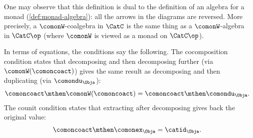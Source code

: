 \begin{remark}
\label{rem:coalgebra-duality}
One may observe that this definition is dual to the definition of an algebra for a monad (\cref{def:monad-algebra}): all the arrows in the diagrams are reversed.
More precisely, a $\comonW$-coalgebra in $\CatC$ is the same thing as a $\comonW$-algebra in $\CatC\op$ (where $\comonW$ is viewed as a monad on $\CatC\op$).
\end{remark}

\begin{remark}
\label{rem:coalgebra-conditions-spelled-out}
In terms of equations, the conditions say the following.
The cocomposition condition states that decomposing and then decomposing further (via $\comonW(\comoncoact)$) gives the same result as decomposing and then duplicating (via $\comondu_\Obja$):
\begin{equation}
\comoncoact \mthen \comonW(\comoncoact) = \comoncoact \mthen \comondu_\Obja.
\end{equation}
The counit condition states that extracting after decomposing gives back the original value:
\begin{equation}
\comoncoact \mthen \comonex_\Obja = \catid_\Obja.
\end{equation}
\end{remark}


